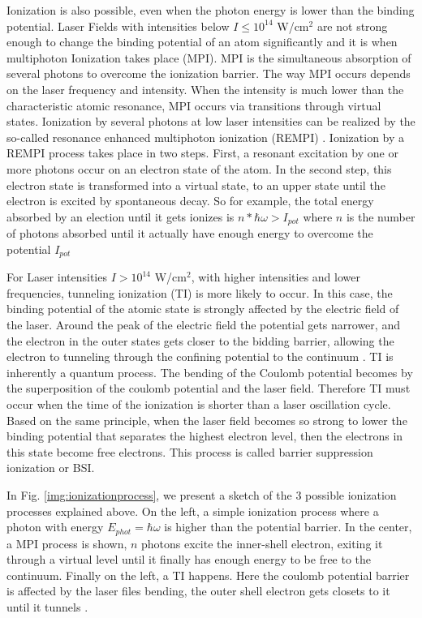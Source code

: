Ionization is also possible, even when the photon energy is lower than the binding potential. Laser Fields with intensities below $I \leqslant 10^{14}$ W/cm$^{2}$ are not strong enough to change the binding potential of an atom significantly \cite{rhodes_multiphoton_1985} and it is when multiphoton Ionization takes place (MPI).  MPI is the simultaneous absorption of several photons to overcome the ionization barrier. The way MPI occurs depends on the laser frequency and intensity. When the intensity is much lower than the characteristic atomic resonance, MPI occurs via transitions through virtual states. Ionization by several photons at low laser intensities can be realized by the so-called resonance enhanced multiphoton ionization (REMPI) \cite{mainfray_multiphoton_nodate}.  Ionization by a REMPI process takes place in two steps. First, a resonant excitation by one or more photons occur on an electron state of the atom. In the second step, this electron state is transformed into a virtual state, to an upper state until the electron is excited by spontaneous decay. So for example, the total energy absorbed by an election until it gets ionizes is $n * \hbar\omega > I_{pot}$ where $n$ is the number of photons absorbed until it actually have enough energy to overcome the potential $I_{pot}$

For Laser intensities $I > 10^{14}$ W/cm$^{2}$,  with higher intensities and lower frequencies, tunneling ionization (TI) is more likely to occur.  In this case, the binding potential of the atomic state is strongly affected by the electric field of the laser. Around the peak of the electric field the  potential gets narrower, and the electron in the outer states gets closer to the bidding barrier, allowing the electron to tunneling through the confining potential to the continuum  \cite{griffiths_introduction_2013}. TI is inherently a quantum process. The bending of the Coulomb potential becomes by the superposition of the coulomb potential and the laser field. Therefore TI must occur when the time of the ionization is shorter than a laser oscillation cycle\cite{berkowitz_photoabsorption_1979}. Based on the same principle, when the laser field becomes so strong to lower the binding potential that separates the highest electron level, then the electrons in this state become free electrons. This process is called barrier suppression ionization or BSI\cite{krishnan_doped_2011}.

In Fig. \ref{img:ionizationprocess}, we present a sketch of the 3 possible ionization processes explained above. On the left, a simple ionization process where a photon with energy $E_{phot} = \hbar\omega$ is higher than the potential barrier. In the center, a MPI process is shown, $n$ photons excite the inner-shell electron, exiting it through a virtual level until it finally has enough energy to be free to the continuum. Finally on the left, a TI happens. Here the coulomb potential barrier is affected by the laser files bending, the outer shell electron gets closets to it until it tunnels \cite{rafipoor_two-color_2017}.

